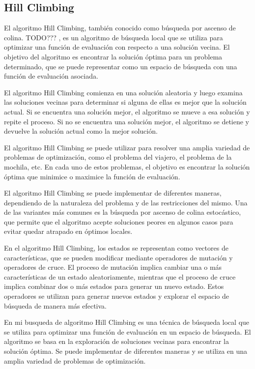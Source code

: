 \subsection{Hill Climbing}
\label{alg:approachHC}
El algoritmo Hill Climbing, también conocido como búsqueda por ascenso de colina. TODO??? , es un algoritmo de búsqueda local que se utiliza para optimizar una función de evaluación con respecto a una solución vecina. El objetivo del algoritmo es encontrar la solución óptima para un problema determinado, que se puede representar como un espacio de búsqueda con una función de evaluación asociada.

El algoritmo Hill Climbing comienza en una solución aleatoria y luego examina las soluciones vecinas para determinar si alguna de ellas es mejor que la solución actual. Si se encuentra una solución mejor, el algoritmo se mueve a esa solución y repite el proceso. Si no se encuentra una solución mejor, el algoritmo se detiene y devuelve la solución actual como la mejor solución.

El algoritmo Hill Climbing se puede utilizar para resolver una amplia variedad de problemas de optimización, como el problema del viajero, el problema de la mochila, etc. En cada uno de estos problemas, el objetivo es encontrar la solución óptima que minimice o maximice la función de evaluación.

El algoritmo Hill Climbing se puede implementar de diferentes maneras, dependiendo de la naturaleza del problema y de las restricciones del mismo. Una de las variantes más comunes es la búsqueda por ascenso de colina estocástico, que permite que el algoritmo acepte soluciones peores en algunos casos para evitar quedar atrapado en óptimos locales.

En el algoritmo Hill Climbing, los estados se representan como vectores de características, que se pueden modificar mediante operadores de mutación y operadores de cruce. El proceso de mutación implica cambiar una o más características de un estado aleatoriamente, mientras que el proceso de cruce implica combinar dos o más estados para generar un nuevo estado. Estos operadores se utilizan para generar nuevos estados y explorar el espacio de búsqueda de manera más efectiva.

En mi busqueda de algoritmo Hill Climbing es una técnica de búsqueda local que se utiliza para optimizar una función de evaluación en un espacio de búsqueda. El algoritmo se basa en la exploración de soluciones vecinas para encontrar la solución óptima. Se puede implementar de diferentes maneras y se utiliza en una amplia variedad de problemas de optimización.


